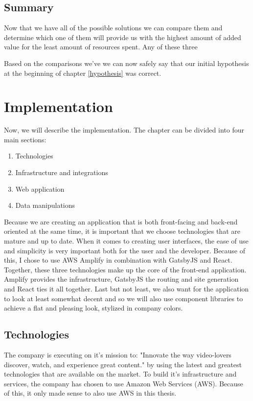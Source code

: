 \documentclass[12pt,oneside]{fithesis2}
\begin{document}
\section{Summary}
Now that we have all of the possible solutions we can compare them and determine which one of them will provide us with the highest amount of added value for the least amount of resources spent. Any of these three 

Based on the comparisons we've we can now safely say that our initial hypothesis at the beginning of chapter \ref{hypothesis} was correct.

\chapter{Implementation}
Now, we will describe the implementation. The chapter can be divided into four main sections:
\begin{enumerate}
    \setlength\itemsep{0em}
    \item Technologies
    \item Infrastructure and integrations
    \item Web application
    \item Data manipulations
\end{enumerate}


Because we are creating an application that is both front-facing and back-end oriented at the same time, it is important that we choose technologies that are mature and up to date.
When it comes to creating user interfaces, the ease of use and simplicity is very important both for the user and the developer. Because of this, I chose to use AWS Amplify in combination with GatsbyJS and React. Together, these three technologies make up the core of the front-end application. Amplify provides the infrastructure, GatsbyJS the routing and site generation and React ties it all together. Last but not least, we also want for the application to look at least somewhat decent and so we will also use component libraries to achieve a flat and pleasing look, stylized in company colors.

\section{Technologies}
The company is executing on it's mission to: "Innovate the way video-lovers discover, watch, and experience great content."\cite{24i-mission} by using the latest and greatest technologies that are available on the market. To build it's infrastructure and services, the company has chosen to use Amazon Web Services (AWS). Because of this, it only made sense to also use AWS in this thesis.
\end{document}
